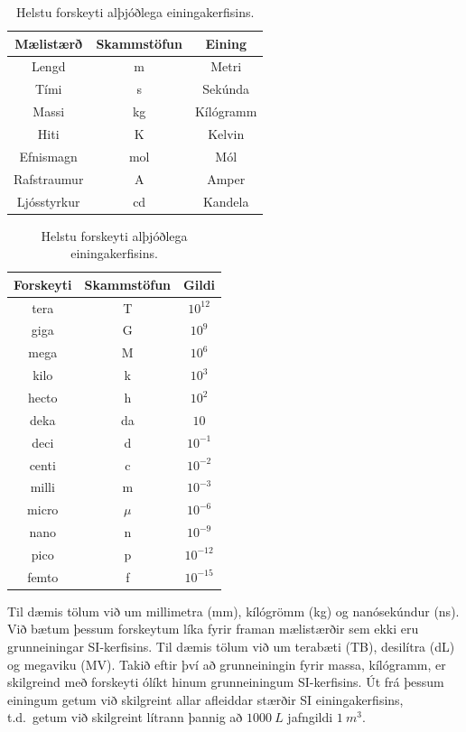 \ifdefined \wholebook \else\documentclass[oneside]{book}\usepackage{EdlBook}\graphicspath{{figures/}}
\begin{document}
\begin{table}[H]
\centering
\begin{minipage}[t]{0.5\linewidth}
\centering

\begin{tabular}{|c|c|c|}
\hline
\textbf{Mælistærð} & \textbf{Skammstöfun} & \textbf{Eining} \\
\hline
Lengd & m & Metri \\
Tími & s & Sekúnda \\
Massi & kg & Kílógramm  \\
Hiti & K  & Kelvin \\
Efnismagn & mol & Mól \\
Rafstraumur  & A    & Amper  \\
Ljósstyrkur  & cd & Kandela \\
\hline
\end{tabular}
\caption{Grunneiningar alþjóðlega einingakerfisins.}
\label{tafla:einingakerfi}
\end{minipage}\hfill
\begin{minipage}[t]{0.5\linewidth}
\centering
\begin{tabular}{|c|c|c|}
\hline
\textbf{Forskeyti} & \textbf{Skammstöfun} & \textbf{Gildi} \\
\hline
tera & T & $10^{12}$ \\
giga & G & $10^9$ \\
mega & M & $10^6$  \\
kilo & k  & $10^3$ \\
hecto & h & $10^2$ \\
deka  & da    & $10$  \\
deci  & d & $10^{-1}$ \\
centi  & c & $10^{-2}$ \\
milli  & m & $10^{-3}$ \\
micro  & $\mu$ & $10^{-6}$ \\
nano  & n & $10^{-9}$ \\
pico  & p & $10^{-12}$ \\
femto  & f & $10^{-15}$ \\
\hline
\end{tabular}
\caption{Helstu forskeyti alþjóðlega einingakerfisins.}
\label{tafla:forskeyti}
\end{minipage}
\end{table}


Til dæmis tölum við um millimetra (mm), kílógrömm (kg) og nanósekúndur (ns). Við bætum þessum forskeytum líka fyrir framan mælistærðir sem ekki eru grunneiningar SI-kerfisins. Til dæmis tölum við um terabæti (TB), desilítra (dL) og megaviku (MV). Takið eftir því að grunneiningin fyrir massa, kílógramm, er skilgreind með forskeyti ólíkt hinum grunneiningum SI-kerfisins. Út frá þessum einingum getum við skilgreint allar afleiddar stærðir SI einingakerfisins, t.d.~getum við skilgreint lítrann þannig að $\SI{1000}{L}$ jafngildi $\SI{1}{m^3}$.
\end{document}
